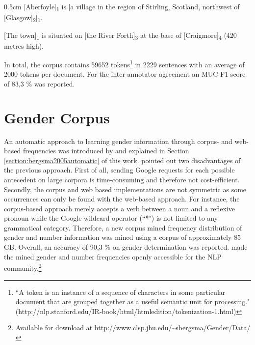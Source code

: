 \begin{addmargin}[0.5cm]{0.5cm}
[Aberfoyle]\textsubscript{1} is [a village in the region of Stirling, Scotland, northwest of [Glasgow]\textsubscript{2}]\textsubscript{1}.

[The town]\textsubscript{1} is situated on [the River Forth]\textsubscript{3} at the base of [Craigmore]\textsubscript{4} (420 metres high).
\end{addmargin}

In total, the corpus contains 59652 tokens\footnote{``A token is an instance of a sequence of characters in some particular document that are grouped together as a useful semantic unit for processing." (http://nlp.stanford.edu/IR-book/html/htmledition/tokenization-1.html)} in 2229 sentences with an average of 2000 tokens per document. For the inter-annotator agreement an MUC F1 score \citep{vilain1995model} of 83,3 \% was reported.

\section{Gender Corpus}
\label{section:gendercorpus}
An automatic approach to learning gender information through corpus- and web-based frequencies was introduced by \cite{bergsma2005automatic} and explained in Section \ref{section:bergsma2005automatic} of this work. 
\cite{Bergsma:06} pointed out two disadvantages of the previous approach. First of all, sending Google requests for each possible antecedent on large corpora is time-consuming and therefore not cost-efficient. Secondly, the corpus and web based implementations are not symmetric as some occurrences can only be found with the web-based approach. For instance, the corpus-based approach merely accepts a verb between a noun and a reflexive pronoun while the Google wildcard operator (``*") is not limited to any grammatical category.
Therefore, a new corpus mined frequency distribution of gender and number information was mined using a corpus of approximately 85 GB. Overall, an accuracy of 90,3 \% on gender determination was reported. \cite{Bergsma:06} made the mined gender and number frequencies openly accessible for the NLP community.\footnote{Available for download at http://www.clsp.jhu.edu/\textasciitilde sbergsma/Gender/Data/}